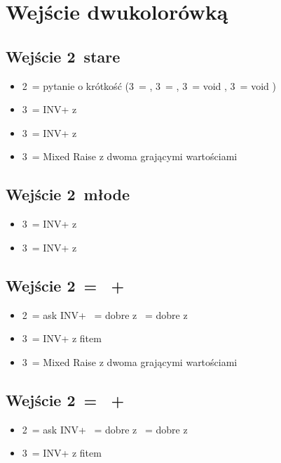 \documentclass[12pt, a4paper]{article}
\begin{document}
\pagebreak
\section{Wejście dwukolorówką}
\subsection*{Wejście 2\diams\ stare}
\begin{itemize}
    \item 2\nt\ = pytanie o krótkość (3\clubs\ = \clubs, 3\diams\ = \diams, 3\hearts\ = void \clubs, 3\spades\ = void \diams)
    \item 3\clubs\ = INV+ z \hearts
    \item 3\diams\ = INV+ z \spades
    \item 3\major\ = Mixed Raise z dwoma grającymi wartościami
\end{itemize}

\subsection*{Wejście 2\ntx\ młode}
\begin{itemize}
    \item 3\hearts\ = INV+ z \clubs\
    \item 3\spades\ = INV+ z \diams\
\end{itemize}

\subsection*{Wejście 2\hearts\ = \spades\ + \minor}
\begin{itemize}
    \item 2\nt\ = ask INV+
    \hearts\ = dobre z \clubs
    \subitem 3\spades\ = dobre z \diams
    \item 3\diams\ = INV+ z fitem \spades \imp
    \item 3\spades\ = Mixed Raise z dwoma grającymi wartościami
\end{itemize}

\subsection*{Wejście 2\spades\ = \hearts\ + \minor}
\begin{itemize}
    \item 2\nt\ = ask INV+
    \hearts\ = dobre z \clubs 
    \subitem 3\spades\ = dobre z \diams
    \item 3\diams\ = INV+ z fitem \hearts \imp
\end{itemize}  
\end{document}
